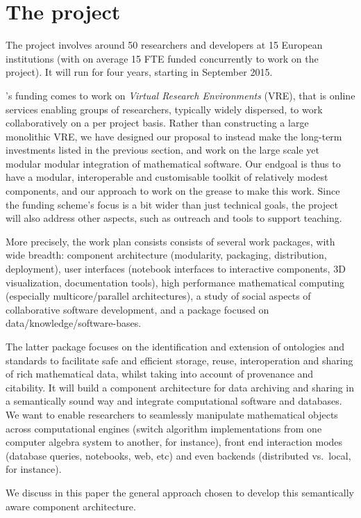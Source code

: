 \section{The \ODK project}\label{sec:odk}
The \ODK project involves around 50 researchers and developers at 15 European institutions (with on average 15 FTE funded concurrently to work on the project). It will run for four years, starting in September 2015.

\ODK's funding comes to work on \emph{Virtual Research Environments} (VRE), that is online services enabling groups of researchers, typically widely dispersed, to work collaboratively on a per project basis. Rather than constructing a large monolithic VRE, we have designed our proposal to instead make the long-term investments listed in the previous section, and work on the large scale yet modular modular integration of mathematical software. Our endgoal is thus to have a modular, interoperable and customisable toolkit of relatively modest components, and our approach to work on the grease to make this work. Since the funding scheme's focus is a bit wider than just technical goals, the project will also address other aspects, such as outreach and tools to support teaching. 

More precisely, the \ODK work plan consists consists of several work packages, with wide breadth: component architecture (modularity, packaging, distribution, deployment), user interfaces (\Jupyter notebook interfaces to interactive components, 3D visualization, documentation tools), high performance mathematical computing (especially multicore/parallel architectures), a study of social aspects of collaborative software development, and a package focused on data/knowledge/software-bases. 

The latter package focuses on the identification and extension of ontologies and standards to facilitate safe and efficient storage, reuse, interoperation and sharing of rich mathematical data, whilst taking into account of provenance and citability. It will build a component architecture for data archiving and sharing in a semantically sound way and integrate computational software and databases. We want to  enable researchers to seamlessly manipulate mathematical objects across computational engines (switch algorithm implementations from one computer algebra system to another, for instance), front end interaction modes (database queries, notebooks, web, etc) and even backends (distributed vs.~local, for instance). 

We discuss in this paper the general approach chosen to develop this semantically aware component architecture. 

